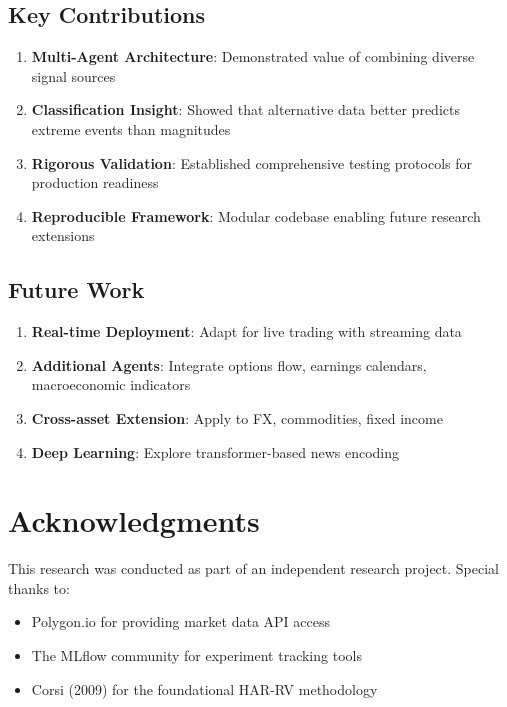 \documentclass[12pt,a4paper]{article}
\begin{document}
\subsection{Key Contributions}

\begin{enumerate}
    \item \textbf{Multi-Agent Architecture}: Demonstrated value of combining diverse signal sources
    \item \textbf{Classification Insight}: Showed that alternative data better predicts extreme events than magnitudes
    \item \textbf{Rigorous Validation}: Established comprehensive testing protocols for production readiness
    \item \textbf{Reproducible Framework}: Modular codebase enabling future research extensions
\end{enumerate}

\subsection{Future Work}

\begin{enumerate}
    \item \textbf{Real-time Deployment}: Adapt for live trading with streaming data
    \item \textbf{Additional Agents}: Integrate options flow, earnings calendars, macroeconomic indicators
    \item \textbf{Cross-asset Extension}: Apply to FX, commodities, fixed income
    \item \textbf{Deep Learning}: Explore transformer-based news encoding
\end{enumerate}

\section*{Acknowledgments}

This research was conducted as part of an independent research project. Special thanks to:

\begin{itemize}
    \item Polygon.io for providing market data API access
    \item The MLflow community for experiment tracking tools
    \item Corsi (2009) for the foundational HAR-RV methodology
\end{itemize}
\end{document}
